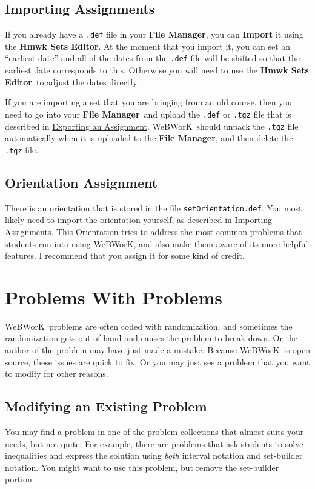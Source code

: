 \documentclass[12pt]{article}
\newcommand{\menu}[1]{\textbf{#1}}
\newcommand{\WW}{WeBWorK}
\newcommand{\HSE}{\menu{Hmwk Sets Editor}}
\newcommand{\FM}{\menu{File Manager}}
\begin{document}
\subsection{Importing Assignments}\label{imp}
If you already have  a \texttt{.def} file in your \FM, you can \menu{Import} it using the \HSE.
At the moment that you import it, you can set an ``earliest date'' and all of the dates from the \texttt{.def} file will be shifted so that the earliest date corresponds to this.
Otherwise you will need to use the \HSE\ to adjust the dates directly.

If you are importing a set that you are bringing from an old course, then you need to go into your \FM\ and upload the \texttt{.def} or \texttt{.tgz} file that is described in \hyperref[exp]{Exporting an Assignment}.
\WW\ should unpack the \texttt{.tgz} file automatically when it is uploaded to the \FM, and then delete the \texttt{.tgz} file.

\subsection{Orientation Assignment}\label{orientation}
There is an orientation that is stored in the file \texttt{setOrientation.def}.
You most likely need to import the orientation yourself, as described in \hyperref[imp]{Importing Assignments}.
This Orientation tries to address the most common problems that students run into using \WW, and also make them aware of its more helpful features.
I recommend that you assign it for some kind of credit.

\section{Problems With Problems}
\WW\ problems are often coded with randomization, and sometimes the randomization gets out of hand and causes the problem to break down.
Or the author of the problem may have just made a mistake.
Because \WW\ is open source, these issues are quick to fix.
Or you may just see a problem that you want to modify for other reasons.

\subsection{Modifying an Existing Problem}

You may find a problem in one of the problem collections that almost suits your needs, but not quite.
For example, there are problems that ask students to solve inequalities and express the solution using \emph{both} interval notation and set-builder notation.
You might want to use this problem, but remove the set-builder portion.
\end{document}
